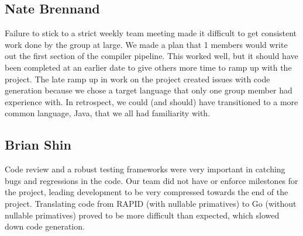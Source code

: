 
\subsection*{Nate Brennand}

Failure to stick to a strict weekly team meeting made it difficult to get consistent work done by the group at large.
We made a plan that 1  members would write out the first section of the compiler pipeline.
This worked well, but it should have been completed at an earlier date to give others more time to ramp up with the project.
The late ramp up in work on the project created issues with code generation because we chose a target language that only one group member had experience with.
In retrospect, we could (and should) have transitioned to a more common language, Java, that we all had familiarity with.

\subsection*{Brian Shin}

Code review and a robust testing frameworks were very important in catching bugs and regressions in the code.
Our team did not have or enforce milestones for the project, leading development to be very compressed towards the end of the project.
Translating code from RAPID (with nullable primatives) to Go (without nullable primatives) proved to be more difficult than expected, which slowed down code generation.
